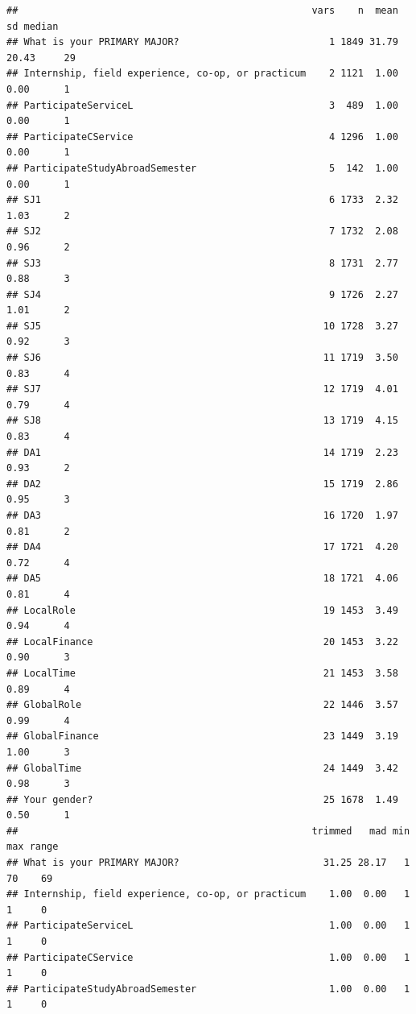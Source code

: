 \documentclass[
]{book}
\begin{document}
\begin{verbatim}
##                                                   vars    n  mean    sd median
## What is your PRIMARY MAJOR?                          1 1849 31.79 20.43     29
## Internship, field experience, co-op, or practicum    2 1121  1.00  0.00      1
## ParticipateServiceL                                  3  489  1.00  0.00      1
## ParticipateCService                                  4 1296  1.00  0.00      1
## ParticipateStudyAbroadSemester                       5  142  1.00  0.00      1
## SJ1                                                  6 1733  2.32  1.03      2
## SJ2                                                  7 1732  2.08  0.96      2
## SJ3                                                  8 1731  2.77  0.88      3
## SJ4                                                  9 1726  2.27  1.01      2
## SJ5                                                 10 1728  3.27  0.92      3
## SJ6                                                 11 1719  3.50  0.83      4
## SJ7                                                 12 1719  4.01  0.79      4
## SJ8                                                 13 1719  4.15  0.83      4
## DA1                                                 14 1719  2.23  0.93      2
## DA2                                                 15 1719  2.86  0.95      3
## DA3                                                 16 1720  1.97  0.81      2
## DA4                                                 17 1721  4.20  0.72      4
## DA5                                                 18 1721  4.06  0.81      4
## LocalRole                                           19 1453  3.49  0.94      4
## LocalFinance                                        20 1453  3.22  0.90      3
## LocalTime                                           21 1453  3.58  0.89      4
## GlobalRole                                          22 1446  3.57  0.99      4
## GlobalFinance                                       23 1449  3.19  1.00      3
## GlobalTime                                          24 1449  3.42  0.98      3
## Your gender?                                        25 1678  1.49  0.50      1
##                                                   trimmed   mad min max range
## What is your PRIMARY MAJOR?                         31.25 28.17   1  70    69
## Internship, field experience, co-op, or practicum    1.00  0.00   1   1     0
## ParticipateServiceL                                  1.00  0.00   1   1     0
## ParticipateCService                                  1.00  0.00   1   1     0
## ParticipateStudyAbroadSemester                       1.00  0.00   1   1     0

\end{verbatim}
\end{document}
